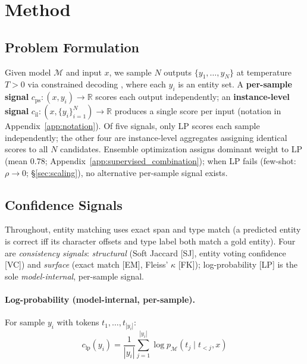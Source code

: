 \section{Method}\label{sec:method}

\subsection{Problem Formulation}\label{sec:formulation}

Given model $\mathcal{M}$ and input $x$, we sample $N$ outputs $\{y_1, \ldots, y_N\}$ at temperature $T > 0$ via constrained decoding \cite{willard2023guided}, where each $y_i$ is an entity set.
A \textbf{per-sample signal} $c_{\text{ps}}: (x, y_i) \to \mathbb{R}$ scores each output independently; an \textbf{instance-level signal} $c_{\text{il}}: (x, \{y_i\}_{i=1}^N) \to \mathbb{R}$ produces a single score per input (notation in Appendix~\ref{app:notation}).
Of five signals, only LP scores each sample independently; the other four are instance-level aggregates assigning identical scores to all $N$ candidates.
Ensemble optimization assigns dominant weight to LP (mean $0.78$; Appendix~\ref{app:supervised_combination}); when LP fails (few-shot: $\rho{\to}0$; \S\ref{sec:scaling}), no alternative per-sample signal exists.

\subsection{Confidence Signals}\label{sec:signals}

Throughout, entity matching uses exact span and type match (a predicted entity is correct iff its character offsets and type label both match a gold entity).
Four are \textit{consistency signals}: \textit{structural} (Soft Jaccard [SJ], entity voting confidence [VC]) and \textit{surface} (exact match [EM], Fleiss' $\kappa$ [FK]); log-probability [LP] is the sole \textit{model-internal}, per-sample signal.

\paragraph{Log-probability (model-internal, per-sample).}
For sample $y_i$ with tokens $t_1, \ldots, t_{|y_i|}$:
\begin{equation}\label{eq:logprob}
c_{\text{lp}}(y_i) = \frac{1}{|y_i|} \sum_{j=1}^{|y_i|} \log p_{\mathcal{M}}(t_j \mid t_{<j}, x)
\end{equation}

